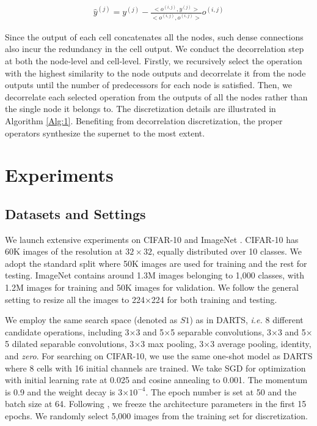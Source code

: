 \documentclass[journal]{IEEEtran}
\begin{document}
 
\begin{equation}
\begin{aligned}
\hat{y}^{(j)} = y^{(j)}-\frac{<o^{(i,j)},y^{(j)}>}{<o^{(i,j)},o^{(i,j)}>}o^{(i,j)}
\label{Formula.2}
\end{aligned}
\end{equation}

Since the output of each cell concatenates all the nodes, such dense connections also incur the redundancy in the cell output. We conduct the decorrelation step at both the node-level and cell-level. Firstly, we recursively select the operation with the highest similarity to the node outputs and decorrelate it from the node outputs until the number of predecessors for each node is satisfied. Then, we decorrelate each selected operation from the outputs of all the nodes rather than the single node it belongs to. The discretization details are illustrated in Algorithm \ref{Alg:1}. Benefiting from decorrelation discretization, the proper operators synthesize the supernet to the most extent. 





\section{Experiments}
\label{S.EXP}
\subsection{Datasets and Settings}
\label{S.exp.ds}
We launch extensive experiments on CIFAR-10  \cite{krizhevsky2009learning} and ImageNet \cite{DBLP:conf/cvpr/DengDSLL009}. CIFAR-10 has 60K images of the resolution at $32\times 32$, equally distributed over 10 classes. We adopt the standard split where 50K images are used for training and the rest for testing. ImageNet contains around 1.3M images belonging to 1,000 classes, with 1.2M images for training and 50K images for validation. We follow the general setting to resize all the images to 224$\times$224 for both training and testing.


We employ the same search space (denoted as $S1$) as in DARTS, \emph{i.e.} 8 different candidate operations, including 3$\times $3 and 5$\times $5 separable convolutions, 3$\times $3 and 5$\times $5 dilated separable convolutions, 3$\times $3 max pooling, 3$\times $3 average pooling, identity, and \emph{zero}. For searching on CIFAR-10, we use the same one-shot model as DARTS where 8 cells with 16 initial channels are trained. We take SGD for optimization with initial learning rate at 0.025 and cosine annealing to 0.001. The momentum is 0.9 and the weight decay is 3$\times10^{-4}$. The epoch number is set at 50 and the batch size at 64. Following \cite{DBLP:journals/corr/abs-1907-05737}, we freeze the architecture parameters in the first 15 epochs. We randomly select 5,000 images from the training set for discretization. 
\end{document}
